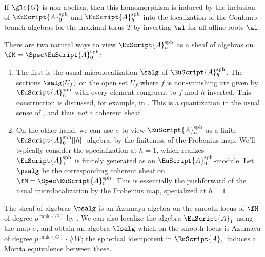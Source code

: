 If $\gls{G}$ is non-abelian, then this homomorphism is induced by the
inclusion of $\EuScript{A}_0^{\operatorname{sph}}$ and $\EuScript{A}_h^{\operatorname{sph}}$ into the
localization of the Coulomb branch algebras for the maximal torus $T$ by inverting $\al$ for all affine
roots $\al$.  

There are two natural ways to view $\EuScript{A}_h^{\operatorname{sph}}$ as a sheaf of algebras on $\fM=\Spec \EuScript{A}_0^{\operatorname{sph}}$:
\begin{enumerate}
\item The first is the usual microlocalization $\salg$ of
  $\EuScript{A}_h^{\operatorname{sph}}$. The sections $\salg(U_f)$ on the
  open set $U_f$ where $f$ is non-vanishing are given by
  $\EuScript{A}_h^{\operatorname{sph}}$ with every element congruent
  to $f$ mod $h$ inverted.  This construction is discussed, for example, in \cite[\S 4.1]{BLPWquant}.  This is a quantization in the usual sense
  of \cite{BKpos}, and thus {\it not} a coherent sheaf.

\item On the other hand, we can use $\sigma$ to view  $\EuScript{A}_h^{\operatorname{sph}}$ as a finite $\EuScript{A}_0^{\operatorname{sph}}[[h]]$-algebra, by the finiteness of the Frobenius map.  We'll typically consider the specialization at
$h=1$, which realizes $\EuScript{A}_1^{\operatorname{sph}}$ is finitely generated as an $\EuScript{A}_0^{\operatorname{sph}}$-module.  Let $\psalg$ be the corresponding coherent sheaf on $\fM=\Spec \EuScript{A}_0^{\operatorname{sph}}$.  This is essentially the 
pushforward of the usual microlocalization by the
Frobenius map, specialized at $h=1$.
\end{enumerate}


The sheaf of algebras $\psalg$ is an Azumaya
algebra on the smooth locus of $\fM$  of degree $p^{\operatorname{rank}(G)}$ by \cite[Lemma 3.2]{BKpos}.  We can also localize the algebra $\EuScript{A}_1$ using the map $\sigma$, and obtain an algebra $\Isalg$ which on the smooth locus is Azumaya of degree $p^{\operatorname{rank}(G)}\cdot \#W$; the spherical idempotent in $\EuScript{A}_1$ induces a Morita equivalence between these.

